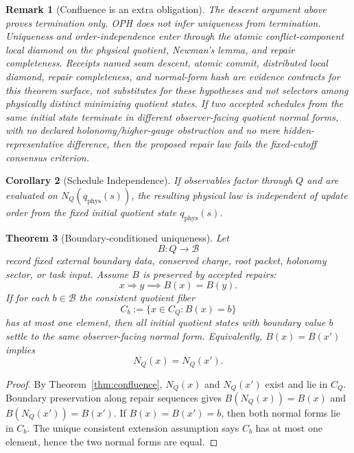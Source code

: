 \documentclass[11pt]{article}
\newtheorem{theorem}{Theorem}[section]
\newtheorem{corollary}[theorem]{Corollary}
\newtheorem{remark}[theorem]{Remark}
\begin{document}
\begin{remark}[Confluence is an extra obligation]
The descent argument above proves termination only. OPH does not infer uniqueness from termination.
Uniqueness and order-independence enter through the atomic conflict-component local diamond on the
physical quotient, Newman's lemma, and repair completeness. Receipts named seam descent, atomic
commit, distributed local diamond, repair completeness, and normal-form hash are evidence
contracts for this theorem surface, not substitutes for these hypotheses and not selectors among
physically distinct minimizing quotient states. If two accepted schedules from the same initial
state terminate in different observer-facing quotient normal forms, with no declared
holonomy/higher-gauge obstruction and no mere hidden-representative difference, then the proposed
repair law fails the fixed-cutoff consensus criterion.
\end{remark}

\begin{corollary}[Schedule Independence]
If observables factor through \(Q\) and are evaluated on \(N_Q(q_{\mathrm{phys}}(s))\), the
resulting physical law is independent of update order from the fixed initial quotient state
\(q_{\mathrm{phys}}(s)\).
\end{corollary}

\begin{theorem}[Boundary-conditioned uniqueness]\label{thm:boundary-conditioned-uniqueness}
Let
\[
B:Q\to\mathcal B
\]
record fixed external boundary data, conserved charge, root packet, holonomy sector, or task
input. Assume \(B\) is preserved by accepted repairs:
\[
x\Rightarrow y\implies B(x)=B(y).
\]
If for each \(b\in\mathcal B\) the consistent quotient fiber
\[
C_b:=\{x\in C_Q:B(x)=b\}
\]
has at most one element, then all initial quotient states with boundary value \(b\) settle to the
same observer-facing normal form. Equivalently, \(B(x)=B(x')\) implies
\[
N_Q(x)=N_Q(x').
\]
\end{theorem}

\begin{proof}
By Theorem~\ref{thm:confluence}, \(N_Q(x)\) and \(N_Q(x')\) exist and lie in \(C_Q\). Boundary
preservation along repair sequences gives \(B(N_Q(x))=B(x)\) and
\(B(N_Q(x'))=B(x')\). If \(B(x)=B(x')=b\), then both normal forms lie in \(C_b\). The unique
consistent extension assumption says \(C_b\) has at most one element, hence the two normal forms
are equal.
\end{proof}
\end{document}
